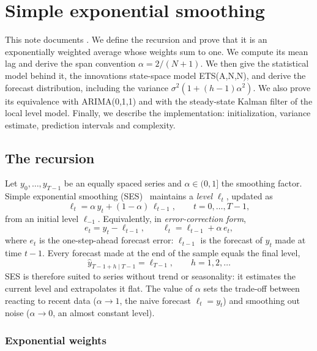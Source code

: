 \chapter{Simple exponential smoothing}\label{ch:es}

This note documents . We
define the recursion and prove that it is an exponentially weighted average whose
weights sum to one. We compute its mean lag and derive the span
convention $\alpha=2/(N+1)$. We then give the statistical model behind it, the
innovations state-space model ETS(A,N,N), and derive the forecast
distribution, including the variance $\sigma^2(1+(h-1)\alpha^2)$. We also prove
its equivalence with ARIMA(0,1,1) and with the steady-state Kalman filter of
the local level model. Finally, we describe the implementation: initialization,
variance estimate, prediction intervals and complexity.




\section{The recursion}

Let $y_0,\dots,y_{T-1}$ be an equally spaced series and $\alpha\in(0,1]$ the
smoothing factor. Simple exponential smoothing (SES)~\cite{brown1959} maintains a
\emph{level} $\ell_t$, updated as
\begin{equation}\label{es:eq:ses}
  \ell_t = \alpha\, y_t + (1-\alpha)\,\ell_{t-1},\qquad t=0,\dots,T-1,
\end{equation}
from an initial level $\ell_{-1}$. Equivalently, in \emph{error-correction form},
\begin{equation}\label{es:eq:error-correction}
  e_t = y_t - \ell_{t-1},\qquad \ell_t = \ell_{t-1} + \alpha\, e_t ,
\end{equation}
where $e_t$ is the one-step-ahead forecast error: $\ell_{t-1}$ is the forecast
of $y_t$ made at time $t-1$. Every forecast made at the end of the sample
equals the final level,
\[
  \hat y_{T-1+h\mid T-1} = \ell_{T-1},\qquad h=1,2,\dots
\]
SES is therefore suited to series without trend or seasonality: it estimates the
current level and extrapolates it flat. The value of $\alpha$ sets the trade-off
between reacting to recent data ($\alpha\to 1$, the naive forecast $\ell_t=y_t$)
and smoothing out noise ($\alpha\to 0$, an almost constant level).

\subsection{Exponential weights}

